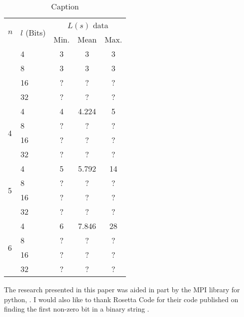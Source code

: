 \documentclass[10pt]{article}
\begin{document}
\begin{table}[ht]
    \centering
    \begin{tabular}{l l|c c c}
    \hline
        \multirow{2}{*}{$n$} & \multirow{2}{*}{$l$ (Bits)} & \multicolumn{3}{c}{$L(s)$ data} \\
         & & Min. & Mean & Max.\\
        \Xhline{3\arrayrulewidth}
        \multirow{4}{*}{3} & 4 & 3 & 3 & 3 \\
         & 8 & 3 & 3 & 3 \\
         & 16 & ? & ? & ? \\
         & 32 & ? & ? & ? \\
        \hline
        \multirow{4}{*}{4} & 4 & 4 & 4.224 & 5 \\
         & 8 & ? & ? & ? \\
         & 16 & ? & ? & ? \\
         & 32 & ? & ? & ? \\
        \hline
        \multirow{4}{*}{5} & 4 & 5 & 5.792 & 14 \\
         & 8 & ? & ? & ? \\
         & 16 & ? & ? & ? \\
         & 32 & ? & ? & ? \\
        \hline
        \multirow{4}{*}{6} & 4 & 6 & 7.846 & 28 \\
         & 8 & ? & ? & ? \\
         & 16 & ? & ? & ? \\
         & 32 & ? & ? & ? \\
        \hline
    \end{tabular}
    \caption{Caption}
    \label{tab:L(s)Analysis}
\end{table}

\begin{acknowledgements}
The research presented in this paper was aided in part by the MPI library for python, \cite{DALCIN20051108}. I would also like to thank Rosetta Code for their code published on finding the first non-zero bit in a binary string \cite{rosetta_code_2021}.
\end{acknowledgements}

\printbibliography
\end{document}
